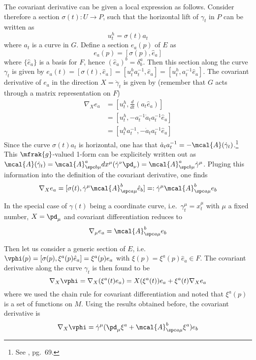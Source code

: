 \documentclass[10pt,reqno]{amsart}
\numberwithin{equation}{section}
\begin{document}
\blankline
The covariant derivative can be given a local expression as follows.  
Consider therefore a section $\sigma(t) : U \rightarrow P$, such that the 
horizontal lift of $\gamma_t$ in $P$ can be written as
%
\begin{displaymath}
	u^h_t = \sigma(t) a_t
\end{displaymath}
%
where $a_t$ is a curve in $G$. Define a section $e_a(p)$ of $E$ as
%
\begin{displaymath}
	e_a(p) = [\sigma(p), \hat{e}_a]
\end{displaymath}
%
where $\{\hat{e}_a\}$ is a basis for $F$, hence $(\hat{e}_a)^b = 
\delta^a_b$. Then this section along the curve $\gamma_t$ is given by 
$e_a(t) = [\sigma(t), \hat{e}_a] = [u^h_t a^{-1}_t, \hat{e}_a] = [u^h_t, 
a^{-1}_t \hat{e}_a]$. The covariant derivative of $e_a$ in the direction 
$X=\dot{\gamma}_t$ is given by (remember that $G$ acts through a matrix 
representation on $F$)
%
\begin{align*}
	\nabla_X e_a &= [u^h_t, \tfrac{d}{dt}(a_t \hat{e}_a)] \\
	&= [u^h_t, -a^{-1}_t \dot{a}_t a^{-1}_t \hat{e}_a] \\
	&= [u^h_t a^{-1}_t, -\dot{a}_t a^{-1}_t \hat{e}_a]
\end{align*}
%
Since the curve $\sigma(t)a_t$ is horizontal, one has that 
$\dot{a}_t a^{-1}_t = -\mcal{A}(\dot{\gamma}_t)$.\footnote{See 
	\cite{nakahara2003geometry}, pg.\ 69.} This $\mfrak{g}$-valued 
1-form can be explicitely written out as 
$\mcal{A}(\dot{\gamma}_t) = \mcal{A}^a_{\spc b\mu} 
dx^\mu(\dot{\gamma}^\nu \pd_\nu) = \mcal{A}^a_{\spc b\mu} 
\dot{\gamma}^\mu$. Pluging this information into the definition 
of the covariant derivative, one finds
%
\begin{equation}
	\nabla_X e_a = [\sigma(t), \dot{\gamma}^\mu \mcal{A}^b_{\spc 
		a\mu} \hat{e}_b ]=:\dot{\gamma}^\mu \mcal{A}^b_{\spc a\mu} 
	e_b
\end{equation}

In the special case of $\gamma(t)$ being a coordinate curve, 
i.e.\ $\gamma^\mu_t = x^\mu_t$ with $\mu$ a fixed number, $X = 
\pd_\mu$ and covariant differentiation reduces to
%
\begin{displaymath}
	\nabla_\mu e_a = \mcal{A}^b_{\spc a\mu} e_b
\end{displaymath}

Then let us consider a generic section of $E$, i.e.\ $\vphi(p) = 
[\sigma(p), \xi^a(p) \hat{e}_a] = \xi^a(p) e_a$ with $\xi(p) = 
\xi^a(p) \hat{e}_a \in F$.
The covariant derivative along the curve $\gamma_t$ is then found 
to be
%
\begin{displaymath}
	\nabla_X \vphi = \nabla_X (\xi^a(t) e_a) = X(\xi^a(t))e_a + 
	\xi^a(t) \nabla_X e_a
\end{displaymath}
where we used the chain rule for covariant differentiation and 
noted that $\xi^a(p)$ is a set of functions on $M$. Using the 
results obtained before, the covariant derivative is
%
\begin{equation}
	\nabla_X \vphi = \dot{\gamma}^\mu (\pd_\mu \xi^a + 
	\mcal{A}^b_{\spc a\mu} \xi^a) e_b
\end{equation}
\end{document}
